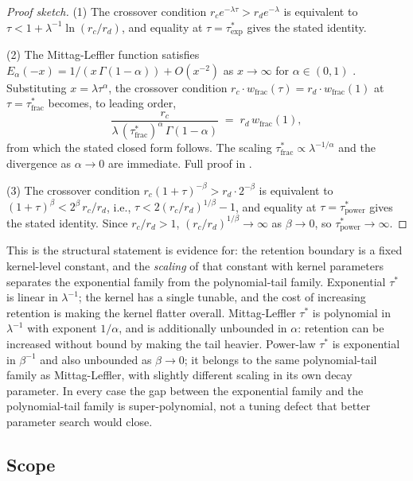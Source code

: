 \documentclass[11pt]{article}
\theoremstyle{plain}
\theoremstyle{definition}
\begin{document}
\begin{proof}[Proof sketch]
(1) The crossover condition
$r_c e^{-\lambda \tau} > r_d e^{-\lambda}$ is
equivalent to
$\tau < 1 + \lambda^{-1}\ln(r_c/r_d)$, and equality
at $\tau = \tau^*_{\mathrm{exp}}$ gives the stated
identity.

(2) The Mittag-Leffler function satisfies
$E_\alpha(-x) = 1/(x\,\Gamma(1-\alpha)) + O(x^{-2})$
as $x \to \infty$ for $\alpha \in (0,1)$
\cite{gorenflo2014ml}.  Substituting $x = \lambda
\tau^\alpha$, the crossover condition
$r_c \cdot w_{\mathrm{frac}}(\tau)
= r_d \cdot w_{\mathrm{frac}}(1)$ at $\tau =
\tau^*_{\mathrm{frac}}$ becomes, to leading order,
\[
\frac{r_c}{\lambda\,
  (\tau^*_{\mathrm{frac}})^\alpha\,\Gamma(1-\alpha)}
\;=\; r_d\,w_{\mathrm{frac}}(1),
\]
from which the stated closed form follows.  The
scaling $\tau^*_{\mathrm{frac}} \propto
\lambda^{-1/\alpha}$ and the divergence as $\alpha
\to 0$ are immediate.  Full proof in
.

(3) The crossover condition
$r_c (1+\tau)^{-\beta} > r_d \cdot 2^{-\beta}$ is
equivalent to
$(1+\tau)^\beta < 2^\beta\,r_c/r_d$,
i.e., $\tau < 2(r_c/r_d)^{1/\beta} - 1$, and
equality at $\tau = \tau^*_{\mathrm{power}}$ gives
the stated identity.  Since $r_c/r_d > 1$,
$(r_c/r_d)^{1/\beta} \to \infty$ as $\beta \to 0$,
so $\tau^*_{\mathrm{power}} \to \infty$.
\end{proof}

This is the structural statement 
is evidence for: the retention boundary is a fixed
kernel-level constant, and the \emph{scaling} of that
constant with kernel parameters separates the
exponential family from the polynomial-tail family.
Exponential $\tau^*$ is linear in $\lambda^{-1}$; the
kernel has a single tunable, and the cost of
increasing retention is making the kernel flatter
overall.  Mittag-Leffler $\tau^*$ is polynomial in
$\lambda^{-1}$ with exponent $1/\alpha$, and is
additionally unbounded in $\alpha$: retention can be
increased without bound by making the tail heavier.
Power-law $\tau^*$ is exponential in $\beta^{-1}$ and
also unbounded as $\beta \to 0$; it belongs to the
same polynomial-tail family as Mittag-Leffler, with
slightly different scaling in its own decay
parameter.  In every case the gap between the
exponential family and the polynomial-tail family is
super-polynomial, not a tuning defect that better
parameter search would close.

\subsection{Scope}
\end{document}
